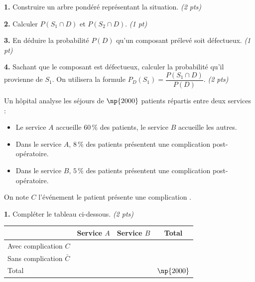\documentclass[11pt,a4paper]{article}
\newcommand{\cadreblanc}[1]{%
\medskip\framebox[\linewidth][c]{%
\rule{0mm}{#1mm}}\par
\medskip}
\newcounter{numexos}
\newcommand{\bex}[2]{%
\def\bextitle{#1}%
\addtocounter{numexos}{1}%
\begin{tcolorbox}[
  enhanced,
  colback=white,colframe=exoheader,
  colbacktitle=exoheader,coltitle=white,
  fonttitle=\bfseries,
  title={Exercice~\thenumexos\ifx\bextitle\empty\else~--~~#1\fi},
  boxrule=0.8pt,arc=3pt,
  left=4mm,right=4mm,top=1mm,bottom=2mm]%
  #2%
\end{tcolorbox}}
\renewcommand{\arraystretch}{1.6}
\begin{document}
\vfill 

\textbf{1.} Construire un arbre pondéré représentant la situation. \hfill\textit{(2 pts)}

\cadreblanc{75}

\vfill 

\textbf{2.} Calculer $P(S_1 \cap D)$ et $P(S_2 \cap D)$. \hfill\textit{(1 pt)}

\cadreblanc{16}

\vfill 


\textbf{3.} En déduire la probabilité $P(D)$ qu'un composant prélevé soit défectueux. \hfill\textit{(1 pt)}

\cadreblanc{16}

\vfill 


\textbf{4.} Sachant que le composant est défectueux, calculer la probabilité qu'il provienne de $S_1$.
On utilisera la formule $P_D(S_1)=\dfrac{P(S_1 \cap D)}{P(D)}$. \hfill\textit{(2 pts)}

\cadreblanc{20}

\vfill 


\newpage

\bex{Tableau de probabilités \hfill \textit{6 points}}{%
\smallskip
Un hôpital analyse les séjours de $\np{2000}$ patients répartis entre deux services :
\begin{itemize}
  \item Le service $A$ accueille $60\,\%$ des patients, le service $B$ accueille les autres.
  \item Dans le service $A$, $8\,\%$ des patients présentent une complication post-opératoire.
  \item Dans le service $B$, $5\,\%$ des patients présentent une complication post-opératoire.
\end{itemize}
On note $C$ l'événement \og le patient présente une complication \fg.
}


\vfill 

\textbf{1.} Compléter le tableau ci-dessous. \hfill\textit{(2 pts)}

\begin{center}
\renewcommand{\arraystretch}{2.2}
\begin{tabular}{|L{5cm}|c|c|c|}
\hline
{} & Service $A$ & Service $B$ & Total \\
\hline
Avec complication $C$ & \hspace{2.5cm} & \hspace{2.5cm} & \\
\hline
Sans complication $\bar{C}$ & & & \\
\hline
Total & & & $\np{2000}$ \\
\hline
\end{tabular}
\end{center}
\end{document}
